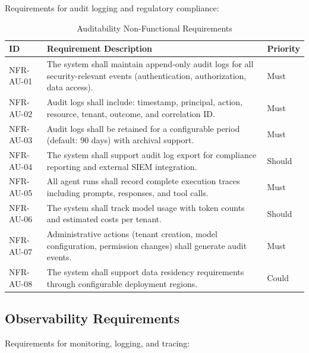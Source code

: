 \documentclass[a4paper,twoside]{sapthesis}
\begin{document}
Requirements for audit logging and regulatory compliance:

\begin{table}[htbp]
\centering
\caption{Auditability Non-Functional Requirements}
\label{tab:nfr-audit}
\small
\begin{tabularx}{\textwidth}{|l|X|l|}
\hline
\textbf{ID} & \textbf{Requirement Description} & \textbf{Priority} \\
\midrule
NFR-AU-01 & The system shall maintain append-only audit logs for all security-relevant events (authentication, authorization, data access). & Must \\
\midrule
NFR-AU-02 & Audit logs shall include: timestamp, principal, action, resource, tenant, outcome, and correlation ID. & Must \\
\midrule
NFR-AU-03 & Audit logs shall be retained for a configurable period (default: 90 days) with archival support. & Must \\
\midrule
NFR-AU-04 & The system shall support audit log export for compliance reporting and external SIEM integration. & Should \\
\midrule
NFR-AU-05 & All agent runs shall record complete execution traces including prompts, responses, and tool calls. & Must \\
\midrule
NFR-AU-06 & The system shall track model usage with token counts and estimated costs per tenant. & Should \\
\midrule
NFR-AU-07 & Administrative actions (tenant creation, model configuration, permission changes) shall generate audit events. & Must \\
\midrule
NFR-AU-08 & The system shall support data residency requirements through configurable deployment regions. & Could \\
\midrule
\end{tabularx}
\end{table}

\subsection{Observability Requirements}
\label{subsec:nfr-observability}

Requirements for monitoring, logging, and tracing:
\end{document}
